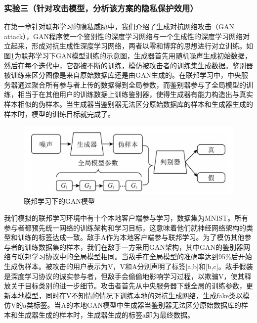 \subsubsection{实验三（针对攻击模型，分析该方案的隐私保护效用）} 
在第一章针对联邦学习的隐私威胁中，我们介绍了生成对抗网络攻击（GAN attack），GAN程序使一个鉴别性的深度学习网络与一个生成性的深度学习网络对立起来，形成对抗生成性深度学习网络，两者以零和博弈的思想进行对立训练。如图\ref{fig:联邦学习下的GAN模型}为联邦学习下GAN模型训练的示意图，生成器首先用随机噪声生成初始数据，然后在每个迭代中，它都被不断的训练，模仿被攻击者的训练集生成数据。鉴别器被训练来区分图像是来自原始数据库还是由GAN生成的。在联邦学习中，中央服务器通过聚合所有参与者上传的数据得到全局参数，而鉴别器参与了全局模型的训练，相当于在其他用户的训练数据上训练鉴别器，使得生成器有能力构造出与真实样本相似的伪样本。当生成器当鉴别器无法区分原始数据库的样本和生成器生成的样本时，模型的训练目标就完成了。

\begin{figure}[!hbt]
\centering
  	\includegraphics[scale=0.6]{fig2/C4/联邦学习GAN}%
	\caption{联邦学习下的GAN模型}
  	\label{fig:联邦学习下的GAN模型} 
\end{figure}

我们模拟的联邦学习环境中有十个本地客户端参与学习，数据集为MNIST。所有参与者都预先统一网络的训练架构和学习目标，这意味着他们就神经网络架构的类型和训练的标签达成一致。敌手A作为本地客户端参与联邦学习。为了模仿其他参与者的训练数据集的样本，我们在敌手一方采用GAN架构，其中GAN的鉴别器网络与联邦学习协议中的全局模型相同。当敌手在全局模型的准确率达到95\%后开始生成伪样本。被攻击的用户表示为V，V和A分别声明了标签[a,b]和[b,c]。敌手假装是深度学习协议的诚实参与者，但敌手会偷偷地影响学习过程，以欺骗V，使其释放关于目标类别的进一步细节。攻击者首先从中央服务器下载全局的训练参数，更新本地模型，同时在V不知情的情况下训练本地的对抗生成网络，生成fake类以模仿V的a类标签。当A的本地GAN模型中生成器当鉴别器无法区分原始数据库的样本和生成器生成的样本时，生成器生成的标签a即为最终数据。

